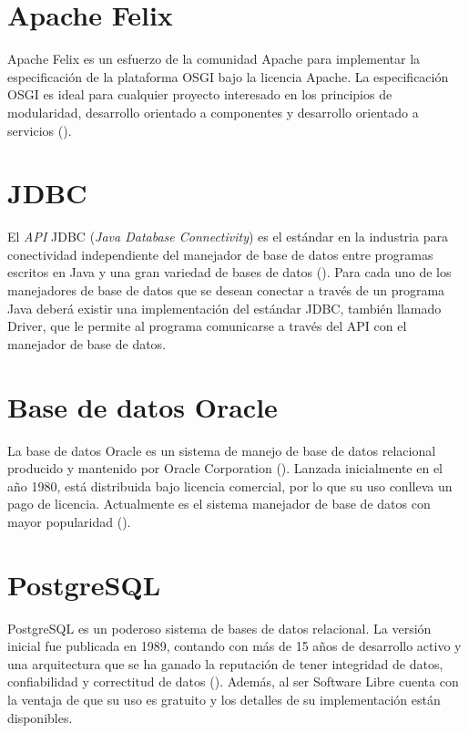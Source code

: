 \section{Apache Felix}

Apache Felix es un esfuerzo de la comunidad Apache para implementar la especificación de
la plataforma OSGI bajo la licencia Apache. La especificación OSGI es ideal para
cualquier proyecto interesado en los principios de modularidad, desarrollo orientado
a componentes y desarrollo orientado a servicios (\cite{FELIX}).

\section{JDBC}

El \emph{API} JDBC (\emph{Java Database Connectivity}) es el estándar en la industria
para conectividad independiente del manejador de base de datos entre programas escritos en
Java y una gran variedad de bases de datos (\cite{JDBC}). Para cada uno de los manejadores
de base de datos que se desean conectar a través de un programa Java deberá existir una implementación
del estándar JDBC, también llamado Driver, que le permite al programa comunicarse a través del
API con el manejador de base de datos.

\section{Base de datos Oracle}

La base de datos Oracle es un sistema de manejo de base de datos relacional
producido y mantenido por Oracle Corporation (\cite{ORACLE}). Lanzada inicialmente en el año 1980,
está distribuida bajo licencia comercial, por lo que su uso conlleva un pago de licencia.
Actualmente es el sistema manejador de base de datos con mayor popularidad (\cite{POPULARITY}).

\section{PostgreSQL}

PostgreSQL es un poderoso sistema de bases de datos relacional. La versión inicial fue
publicada en 1989, contando con más de 15 años de desarrollo activo y una arquitectura
que se ha ganado la reputación de tener integridad de datos, confiabilidad y correctitud
de datos (\cite{POSTGRE}). Además, al ser Software Libre cuenta con la ventaja de que
su uso es gratuito y los detalles de su implementación están disponibles.

